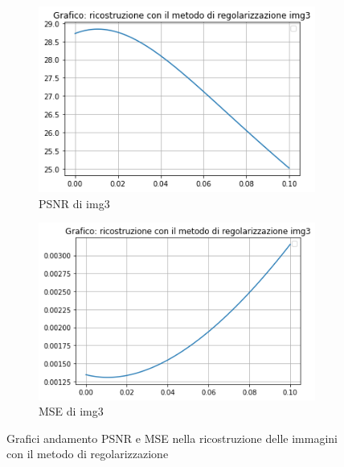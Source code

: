 \begin{figure}[H]
    \begin{subfigure}{0.5\textwidth}
        \centering
        \includegraphics[width=\textwidth]{output/PSNR/outputPSNR-img3.png}
        \caption{PSNR di img3}
        \label{fig:img3PSNR}
    \end{subfigure}\hfill
    \begin{subfigure}{0.5\textwidth}
        \centering
        \includegraphics[width=\textwidth]{output/MSE/outputMSE-img3.png}
        \caption{MSE di img3}
        \label{fig:img3MSE}
    \end{subfigure}
    \caption{Grafici andamento PSNR e MSE nella ricostruzione delle immagini con il metodo di regolarizzazione}
\end{figure}%
